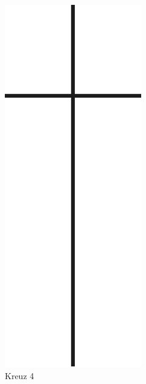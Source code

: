\documentclass[ngerman,a4paper,11pt]{scrreprt}
\begin{document}
\begin{figure}[H]
\centering
\includegraphics[width=\textwidth,height=.8\textheight]{Bilder/Bilder/750_0010_18755_Todesanzeigen_Kreuz.png}
\caption{Kreuz 4}
\end{figure}
\end{document}
